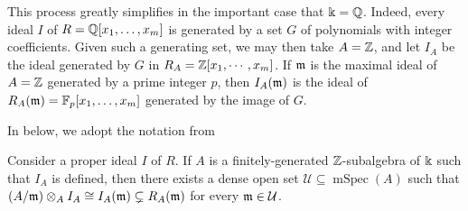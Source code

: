 \documentclass[11pt]{amsart}
\newcommand{\mspec}{\operatorname{mSpec}}
\begin{document}
This process greatly simplifies in the important case that $\Bbbk=\mathbb{Q}$.  Indeed, every ideal $I$ of $R=\mathbb{Q}[x_1, \ldots, x_m]$ is generated by a set $G$ of polynomials with integer coefficients.  Given such a generating set, we may then take $A=\mathbb{Z}$, and let $I_A$ be the ideal generated by $G$ in $R_A=\mathbb{Z}[x_1, \cdots, x_m]$.  If  $\mathfrak{m}$ is the maximal ideal of $A=\mathbb{Z}$ generated by a prime integer $p$, then $I_A(\mathfrak{m})$ is the ideal of $R_A(\mathfrak{m}) = \mathbb{F}_p[x_1, \ldots, x_m]$  generated by the image of $G$.


In  below, we adopt the notation from 


\begin{lemma}
\label{noncontainment mod p: L}
Consider a proper ideal $I$ of $R$.  If $A$ is a finitely-generated $\mathbb{Z}$-subalgebra of $\Bbbk$ such that $I_A$ is defined, then there exists a dense open set $\mathcal{U} \subseteq \mspec(A)$ such that $(A/\mathfrak{m}) \otimes_A I_A \cong I_A(\mathfrak{m}) \subsetneq R_A(\mathfrak{m})$ for every $\mathfrak{m} \in \mathcal{U}$.
\end{lemma}
\end{document}
